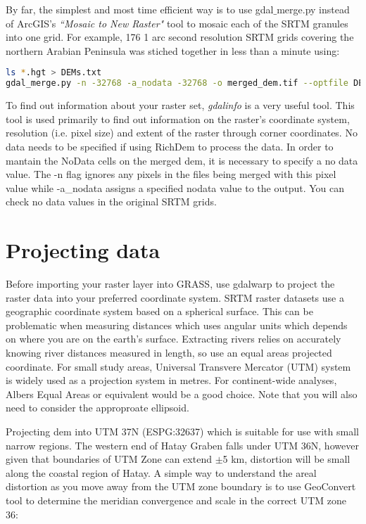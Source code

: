 By far, the simplest and most time efficient way is to use gdal${\_}$merge.py instead of ArcGIS's \textit{``Mosaic to New Raster"} tool to mosaic each of the SRTM granules into one grid. For example, 176 1 arc second resolution SRTM grids covering the northern Arabian Peninsula was stiched together in less than a minute using:

\begin{lstlisting}[language=bash]
ls *.hgt > DEMs.txt
gdal_merge.py -n -32768 -a_nodata -32768 -o merged_dem.tif --optfile DEMs.txt
\end{lstlisting}

To find out information about your raster set, \textit{gdalinfo} is a very useful tool. This tool is used primarily to find out information on the raster’s coordinate system, resolution (i.e. pixel size) and extent of the raster through corner coordinates. No data needs to be specified if using RichDem to process the data. In order to mantain the NoData cells on the merged dem, it is necessary to specify a no data value. The -n flag ignores any pixels in the files being merged with this pixel value while -a_nodata assigns a specified nodata value to the output. You can check no data values in the original SRTM grids. 

\section{Projecting data}

Before importing your raster layer into GRASS, use gdalwarp to project the raster data into your preferred coordinate system. SRTM raster datasets use a geographic coordinate system based on a spherical surface. This can be problematic when measuring distances which uses angular units which depends on where you are on the earth’s surface. Extracting rivers relies on accurately knowing river distances measured in length, so use an equal areas projected coordinate. For small study areas, Universal Transvere Mercator (UTM) system is widely used as a projection system in metres. For continent-wide analyses, Albers Equal Areas or equivalent would be a good choice. Note that you will also need to consider the approproate ellipsoid. 

Projecting dem into UTM 37N (ESPG:32637) which is suitable for use with small narrow regions. The western end of Hatay Graben falls under UTM 36N, however given that boundaries of UTM Zone can extend ${\pm}$5 km, distortion will be small along the coastal region of Hatay. A simple way to understand the areal distortion as you move away from the UTM zone boundary is to use GeoConvert tool to determine the meridian convergence and scale in the correct UTM zone 36:

